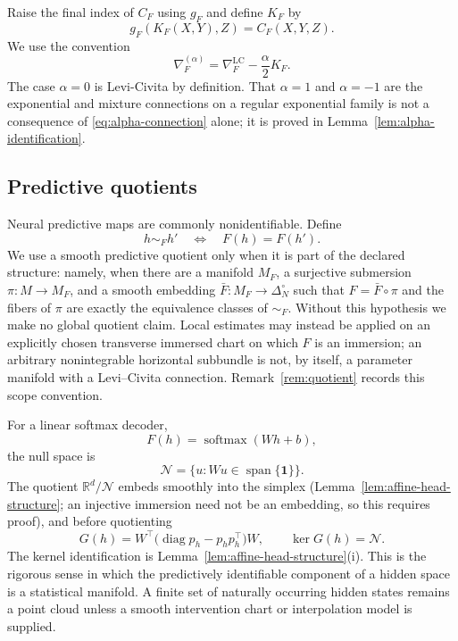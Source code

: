 \documentclass[11pt]{article}
\theoremstyle{definition}
\theoremstyle{remark}
\newcommand{\simplex}{\Delta_{N}^{\circ}}
\newcommand{\R}{\mathbb{R}}
\newcommand{\LC}{\mathrm{LC}}
\begin{document}
Raise the final index of $C_F$ using $g_F$ and define $K_F$ by
\begin{equation}
    g_F(K_F(X,Y),Z)=C_F(X,Y,Z).
\end{equation}
We use the convention
\begin{equation}
    \nabla_F^{(\alpha)}=\nabla_F^{\LC}-\frac{\alpha}{2}K_F.
    \label{eq:alpha-connection}
\end{equation}
The case $\alpha=0$ is Levi-Civita by definition. That $\alpha=1$ and $\alpha=-1$ are the exponential and mixture connections on a regular exponential family is not a consequence of \eqref{eq:alpha-connection} alone; it is proved in Lemma~\ref{lem:alpha-identification}.

\subsection{Predictive quotients}

Neural predictive maps are commonly nonidentifiable. Define
\begin{equation}
    h\sim_F h'\quad\Longleftrightarrow\quad F(h)=F(h').
\end{equation}
We use a smooth predictive quotient only when it is part of the declared
structure: namely, when there are a manifold $M_F$, a surjective submersion
$\pi:M\to M_F$, and a smooth embedding $\bar F:M_F\to\simplex$ such that
$F=\bar F\circ\pi$ and the fibers of $\pi$ are exactly the equivalence classes
of $\sim_F$. Without this hypothesis we make no global quotient claim. Local
estimates may instead be applied on an explicitly chosen transverse immersed
chart on which $F$ is an immersion; an arbitrary nonintegrable horizontal
subbundle is not, by itself, a parameter manifold with a Levi--Civita
connection. Remark~\ref{rem:quotient} records this scope convention.

For a linear softmax decoder,
\begin{equation}
    F(h)=\operatorname{softmax}(Wh+b),
\end{equation}
the null space is
\begin{equation}
    \mathcal N=\{u:Wu\in\operatorname{span}\{\bm 1\}\}.
\end{equation}
The quotient $\R^d/\mathcal N$ embeds smoothly into the simplex (Lemma~\ref{lem:affine-head-structure}; an injective immersion need not be an embedding, so this requires proof), and before quotienting
\begin{equation}
    G(h)=W^\top\bigl(\operatorname{diag}p_h-p_hp_h^\top\bigr)W,
    \label{eq:softmax-metric}
    \qquad \ker G(h)=\mathcal N.
\end{equation}
The kernel identification is Lemma~\ref{lem:affine-head-structure}(i). This is the rigorous sense in which the predictively identifiable component of a hidden space is a statistical manifold. A finite set of naturally occurring hidden states remains a point cloud unless a smooth intervention chart or interpolation model is supplied.
\end{document}
